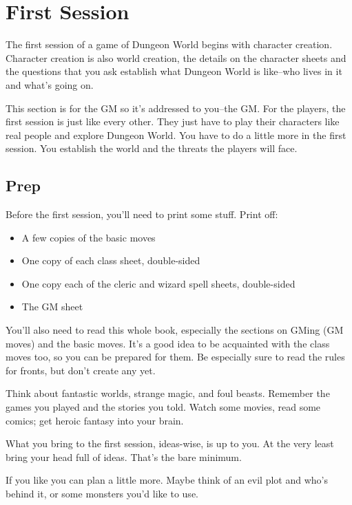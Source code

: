 \chapter{First Session}


The first session of a game of Dungeon World begins with character creation. Character creation is also world creation, the details on the character sheets and the questions that you ask establish what Dungeon World is like--who lives in it and what's going on.


This section is for the GM so it's addressed to you--the GM\@. For the players, the first session is just like every other. They just have to play their characters like real people and explore Dungeon World. You have to do a little more in the first session. You establish the world and the threats the players will face.
\section*{Prep}


Before the first session, you'll need to print some stuff. Print off:
\begin{itemize}
\item A few copies of the basic moves
\item One copy of each class sheet, double-sided
\item One copy each of the cleric and wizard spell sheets, double-sided
\item The GM sheet

\end{itemize}


You'll also need to read this whole book, especially the sections on GMing (GM moves) and the basic moves. It's a good idea to be acquainted with the class moves too, so you can be prepared for them. Be especially sure to read the rules for fronts, but don't create any yet.


Think about fantastic worlds, strange magic, and foul beasts. Remember the games you played and the stories you told. Watch some movies, read some comics; get heroic fantasy into your brain.


What you bring to the first session, ideas-wise, is up to you. At the very least bring your head full of ideas. That's the bare minimum.


If you like you can plan a little more. Maybe think of an evil plot and who's behind it, or some monsters you'd like to use.


